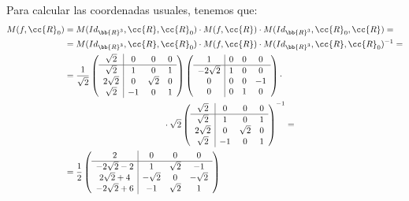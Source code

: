 \begin{ejercicio}
    Para calcular las coordenadas usuales, tenemos que:
    \begin{equation*}
        \begin{split}
            M(f, \cc{R}_0) &= M(Id_{\bb{R}^3}, \cc{R}, \cc{R}_0) \cdot M(f, \cc{R}) \cdot M(Id_{\bb{R}^3}, \cc{R}_0, \cc{R}) =\\
            &= M(Id_{\bb{R}^3}, \cc{R}, \cc{R}_0) \cdot M(f, \cc{R}) \cdot M(Id_{\bb{R}^3}, \cc{R}, \cc{R}_0)^{-1} =\\
            &=\frac{1}{\sqrt{2}}\left(
            \begin{array}{c|ccc}
                \sqrt{2} & 0 & 0 & 0 \\ \hline
                \sqrt{2} & 1 & 0 & 1 \\
                2\sqrt{2} & 0 & \sqrt{2} & 0 \\
                \sqrt{2} & -1 & 0 & 1
            \end{array}
            \right)
            \left(
            \begin{array}{c|ccc}
                1 & 0 & 0 & 0 \\ \hline
                -2\sqrt{2} & 1 & 0 & 0 \\
                0 & 0 & 0 & -1 \\
                0 & 0 & 1 & 0
            \end{array}
            \right)
            \cdot \\& \hspace{4cm} \cdot \sqrt{2}
            \left(
            \begin{array}{c|ccc}
                \sqrt{2} & 0 & 0 & 0 \\ \hline
                \sqrt{2} & 1 & 0 & 1 \\
                2\sqrt{2} & 0 & \sqrt{2} & 0 \\
                \sqrt{2} & -1 & 0 & 1
            \end{array}
            \right)^{-1}
            =\\
            &= \frac{1}{2} \left(
            \begin{array}{c|ccc}
                2 & 0 & 0 & 0 \\ \hline
                -2\sqrt{2}-2 & 1 & \sqrt{2} & -1 \\
                2\sqrt{2}+4 & -\sqrt{2} & 0 & -\sqrt{2}\\
                -2\sqrt{2}+6 & -1 & \sqrt{2} & 1
            \end{array}
            \right)
        \end{split}
    \end{equation*}
\end{ejercicio}

